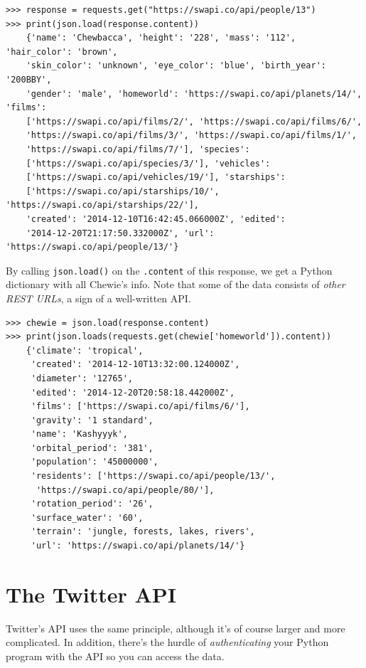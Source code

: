 \small
\begin{Verbatim}[fontsize=\footnotesize,samepage=true,frame=single]
>>> response = requests.get("https://swapi.co/api/people/13")
>>> print(json.load(response.content))
    {'name': 'Chewbacca', 'height': '228', 'mass': '112', 'hair_color': 'brown',
    'skin_color': 'unknown', 'eye_color': 'blue', 'birth_year': '200BBY',
    'gender': 'male', 'homeworld': 'https://swapi.co/api/planets/14/', 'films':
    ['https://swapi.co/api/films/2/', 'https://swapi.co/api/films/6/',
    'https://swapi.co/api/films/3/', 'https://swapi.co/api/films/1/',
    'https://swapi.co/api/films/7/'], 'species':
    ['https://swapi.co/api/species/3/'], 'vehicles':
    ['https://swapi.co/api/vehicles/19/'], 'starships':
    ['https://swapi.co/api/starships/10/', 'https://swapi.co/api/starships/22/'],
    'created': '2014-12-10T16:42:45.066000Z', 'edited':
    '2014-12-20T21:17:50.332000Z', 'url': 'https://swapi.co/api/people/13/'}
\end{Verbatim}
\normalsize

By calling \texttt{json.load()} on the \texttt{.content} of this response, we
get a Python dictionary with all Chewie's info. Note that some of the data
consists of \textit{other REST URLs}, a sign of a well-written API.

\small
\begin{Verbatim}[fontsize=\small,samepage=true,frame=single]
>>> chewie = json.load(response.content)
>>> print(json.loads(requests.get(chewie['homeworld']).content))
    {'climate': 'tropical',
     'created': '2014-12-10T13:32:00.124000Z',
     'diameter': '12765',
     'edited': '2014-12-20T20:58:18.442000Z',
     'films': ['https://swapi.co/api/films/6/'],
     'gravity': '1 standard',
     'name': 'Kashyyyk',
     'orbital_period': '381',
     'population': '45000000',
     'residents': ['https://swapi.co/api/people/13/',
      'https://swapi.co/api/people/80/'],
     'rotation_period': '26',
     'surface_water': '60',
     'terrain': 'jungle, forests, lakes, rivers',
     'url': 'https://swapi.co/api/planets/14/'}
\end{Verbatim}
\normalsize

\pagebreak
\section{The Twitter API}

Twitter's API uses the same principle, although it's of course larger and more
complicated. In addition, there's the hurdle of \textit{authenticating} your
Python program with the API so you can access the data.

